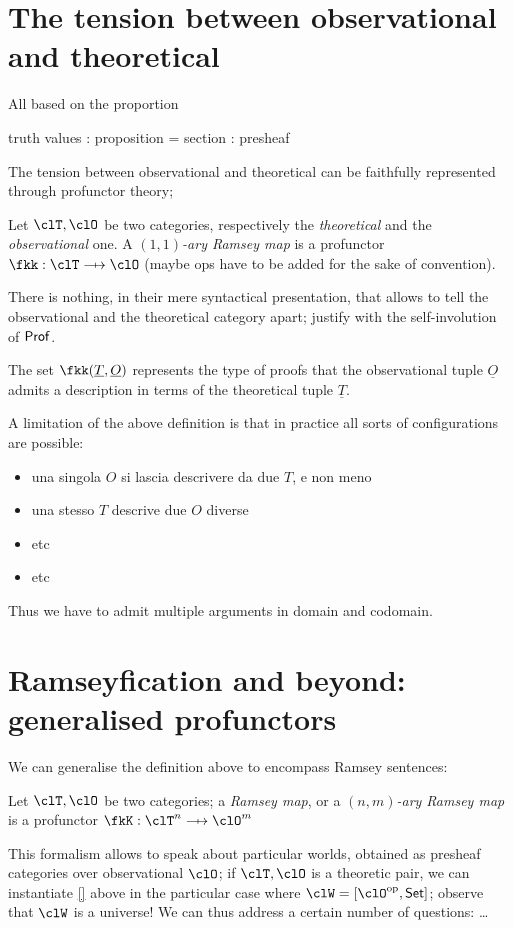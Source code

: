\documentclass[a4paper]{../birkjour}
\begin{document}
\section{The tension between observational and theoretical}
\label{sec:orge11c3c4}
All based on the proportion

truth values : proposition = section : presheaf

The tension between observational and theoretical can be faithfully represented through profunctor theory;
\begin{definition}
  Let $\clT,\clO$ be two categories, respectively the \emph{theoretical} and the \emph{observational} one. A \emph{$(1,1)$-ary Ramsey map} is a profunctor $\fkk : \clT \pto \clO$ (maybe ops have to be added for the sake of convention).
\end{definition}
There is nothing, in their mere syntactical presentation, that allows to tell the observational and the theoretical category apart; justify with the self-involution of $\mathsf{Prof}$.

The set $\fkk(\underline T, \underline O)$ represents the type of proofs that the observational tuple $\underline O$ admits a description in terms of the theoretical tuple $\underline T$.

A limitation of the above definition is that in practice all sorts of configurations are possible:
\begin{itemize}
  \item una singola $O$ si lascia descrivere da due $T$, e non meno
  \item una stesso $T$ descrive due $O$ diverse
  \item etc
  \item etc
\end{itemize}
Thus we have to admit multiple arguments in domain and codomain.
\section{Ramseyfication and beyond: generalised profunctors}
\label{sec:org50db6c2}
We can generalise the definition above to encompass Ramsey sentences:
\begin{definition}
  Let $\clT,\clO$ be two categories; a \emph{Ramsey map}, or a \emph{$(n,m)$-ary Ramsey map} is a profunctor $\fkK : \clT^n \pto \clO^m$
\end{definition}
This formalism allows to speak about particular worlds, obtained as presheaf categories over observational $\clO$; if $\clT, \clO$ is a theoretic pair, we can instantiate \autoref{} above in the particular case where $\clW = [\clO^\op, \Set]$; observe that $\clW$ is a universe! We can thus address a certain number of questions: \dots
\end{document}
